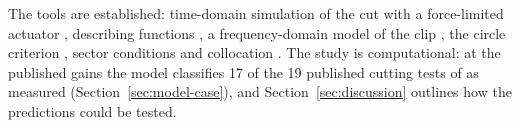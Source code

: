 The tools are established: time-domain simulation of the cut with a force-limited actuator \citep{mancisidor2015coupled,ozsoy2026robust}, describing functions \citep{gelb1968describing}, a frequency-domain model of the clip \citep{ozsoy2025frequency}, the circle criterion \citep{zames1966inputII}, sector conditions \citep{gomesdasilva2005antiwindup} and collocation \citep{breda2005pseudospectral,butcher2009chebyshev}. The study is computational: at the published gains the model classifies 17 of the 19 published cutting tests of \citet{ozsoy2026robust} as measured (Section~\ref{sec:model-case}), and Section~\ref{sec:discussion} outlines how the predictions could be tested.

